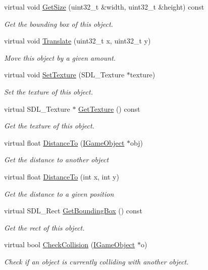 \begin{DoxyCompactItemize}
virtual void \hyperlink{class_i_game_object_ace84e8ce58a6886028f2ada293a170c7}{Get\+Size} (uint32\+\_\+t \&width, uint32\+\_\+t \&height) const 
\begin{DoxyCompactList}\small\item\em Get the bounding box of this object. \end{DoxyCompactList}\item 
virtual void \hyperlink{class_i_game_object_a0c27f50dd3783bdc126beb249dc160d0}{Translate} (uint32\+\_\+t x, uint32\+\_\+t y)
\begin{DoxyCompactList}\small\item\em Move this object by a given amount. \end{DoxyCompactList}\item 
virtual void \hyperlink{class_i_game_object_a6c4babfa9e8eadd50599e5b7c4dd9e12}{Set\+Texture} (S\+D\+L\+\_\+\+Texture $\ast$texture)
\begin{DoxyCompactList}\small\item\em Set the texture of this object. \end{DoxyCompactList}\item 
virtual S\+D\+L\+\_\+\+Texture $\ast$ \hyperlink{class_i_game_object_af2a85a8821cbe4305ce92c8bbe8ecf5e}{Get\+Texture} () const 
\begin{DoxyCompactList}\small\item\em Get the texture of this object. \end{DoxyCompactList}\item 
virtual float \hyperlink{class_i_game_object_a0ef5e610a6afc8215902853820a7e954}{Distance\+To} (\hyperlink{class_i_game_object}{I\+Game\+Object} $\ast$obj)
\begin{DoxyCompactList}\small\item\em Get the distance to another object \end{DoxyCompactList}\item 
virtual float \hyperlink{class_i_game_object_ad34f7ba9433ba5e449852593011ffb6a}{Distance\+To} (int x, int y)
\begin{DoxyCompactList}\small\item\em Get the distance to a given position \end{DoxyCompactList}\item 
virtual S\+D\+L\+\_\+\+Rect \hyperlink{class_i_game_object_aa6ca1547043ec0c072f8dee6f567e2a9}{Get\+Bounding\+Box} () const 
\begin{DoxyCompactList}\small\item\em Get the rect of this object. \end{DoxyCompactList}\item 
virtual bool \hyperlink{class_i_game_object_a7ca855de4ee1b392926dbd6bdd03f6e3}{Check\+Collision} (\hyperlink{class_i_game_object}{I\+Game\+Object} $\ast$o)
\begin{DoxyCompactList}\small\item\em Check if an object is currently colliding with another object. \end{DoxyCompactList}\end{DoxyCompactItemize}
